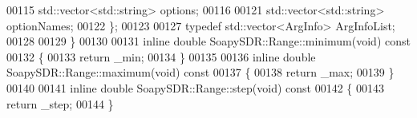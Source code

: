 \begin{DoxyCode}
00115     std::vector<std::string> options;
00116 
00121     std::vector<std::string> optionNames;
00122 \};
00123 
00127 \textcolor{keyword}{typedef} std::vector<ArgInfo> ArgInfoList;
00128 
00129 \}
00130 
00131 \textcolor{keyword}{inline} \textcolor{keywordtype}{double} SoapySDR::Range::minimum(\textcolor{keywordtype}{void})\textcolor{keyword}{ const}
00132 \textcolor{keyword}{}\{
00133     \textcolor{keywordflow}{return} \_min;
00134 \}
00135 
00136 \textcolor{keyword}{inline} \textcolor{keywordtype}{double} SoapySDR::Range::maximum(\textcolor{keywordtype}{void})\textcolor{keyword}{ const}
00137 \textcolor{keyword}{}\{
00138     \textcolor{keywordflow}{return} \_max;
00139 \}
00140 
00141 \textcolor{keyword}{inline} \textcolor{keywordtype}{double} SoapySDR::Range::step(\textcolor{keywordtype}{void})\textcolor{keyword}{ const}
00142 \textcolor{keyword}{}\{
00143     \textcolor{keywordflow}{return} \_step;
00144 \}
\end{DoxyCode}
